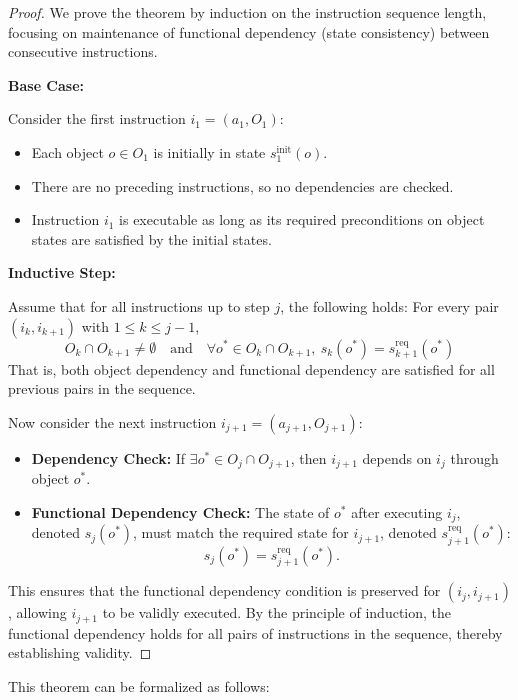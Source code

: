 \documentclass[a4paper,11pt]{lmcs}
\begin{document}
\begin{proof}
We prove the theorem by induction on the instruction sequence length, focusing on maintenance of functional dependency (state consistency) between consecutive instructions.

\textbf{Base Case:}

Consider the first instruction \( i_1 = (a_1, O_1) \):
\begin{itemize}
    \item Each object \( o \in O_1 \) is initially in state \( s_1^{\mathrm{init}}(o) \).
    \item There are no preceding instructions, so no dependencies are checked.
    \item Instruction \( i_1 \) is executable as long as its required preconditions on object states are satisfied by the initial states.
\end{itemize}

\textbf{Inductive Step:}

Assume that for all instructions up to step \(j\), the following holds: For every pair \((i_k, i_{k+1})\) with \(1 \leq k \leq j-1\),
\[
O_k \cap O_{k+1} \neq \emptyset \quad \text{and} \quad
\forall o^* \in O_k \cap O_{k+1},\ s_k(o^*) = s_{k+1}^{\mathrm{req}}(o^*)
\]
That is, both object dependency and functional dependency are satisfied for all previous pairs in the sequence.


Now consider the next instruction \( i_{j+1} = (a_{j+1}, O_{j+1}) \):
\begin{itemize}
    \item \textbf{Dependency Check:} If \( \exists o^* \in O_j \cap O_{j+1} \), then \( i_{j+1} \) depends on \( i_j \) through object \( o^* \).
    \item \textbf{Functional Dependency Check:} The state of \( o^* \) after executing \( i_j \), denoted \( s_j(o^*) \), must match the required state for \( i_{j+1} \), denoted \( s_{j+1}^{\mathrm{req}}(o^*) \):
    \[
    s_j(o^*) = s_{j+1}^{\mathrm{req}}(o^*).
    \]
\end{itemize}

This ensures that the functional dependency condition is preserved for \( (i_j, i_{j+1}) \), allowing \( i_{j+1} \) to be validly executed. By the principle of induction, the functional dependency holds for all pairs of instructions in the sequence, thereby establishing validity.
\end{proof}

This theorem can be formalized as follows:
\end{document}
